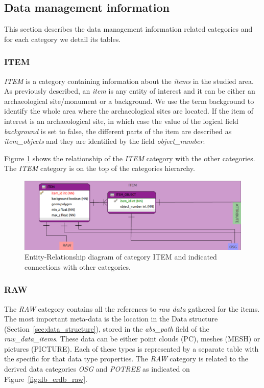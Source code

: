 \subsection{Data management information}
This section describes the data management information related categories and for each category we detail its tables.

\subsubsection{ITEM}
{\em ITEM} is a category containing information about the {\em items} in the studied area.
As previously described, an {\em item} is any entity of interest and it can be either an archaeological site/monument or a background. We use the term background to identify the whole area where the archaeological sites are located. If the item of interest is an archaeological site, in which case the value of the logical field {\em background} is set to false, the different parts of the item are described as {\em item\_objects} and they are identified by the field {\em object\_number}. 

Figure \ref{fig:db_erdb_item} shows the relationship of the {\em ITEM} category with
the other categories. The {\em ITEM} category is on the top of the categories hierarchy.

\begin{figure}[H]
\centering
\includegraphics[scale=0.35]{fig/database/ERDB_ITEM_conn.pdf}
\caption{Entity-Relationship diagram of category ITEM and indicated connections
with other categories.}
\label{fig:db_erdb_item}
\end{figure}

\subsubsection{RAW}
The {\em RAW} category contains all the references to \textit{raw data} gathered for the items.
The most important meta-data is the location in the Data structure (Section~\ref{sec:data_structure}),
stored in the {\em abs\_path} field of the {\em raw\_data\_items}. These data can be either point clouds (PC),
meshes (MESH) or pictures (PICTURE). Each of these types is represented by a separate
table with the specific for that data type properties. The {\em RAW} category is
related to the derived data categories {\em OSG} and {\em POTREE} as indicated on
Figure~\ref{fig:db_erdb_raw}.

